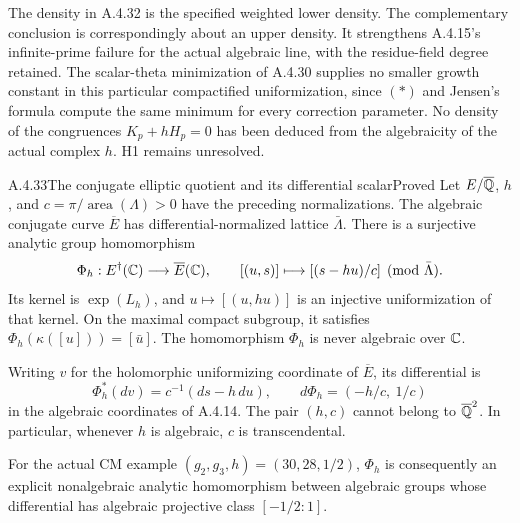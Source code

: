 The density in A.4.32 is the specified weighted lower density.
The complementary conclusion is correspondingly about an upper
density. It strengthens A.4.15's infinite-prime failure for the
actual algebraic line, with the residue-field degree retained.
The scalar-theta minimization of A.4.30 supplies no smaller growth
constant in this particular compactified uniformization, since
$(*)$ and Jensen's formula compute the same minimum for every
correction parameter. No density of the congruences
$K_p+hH_p=0$ has been deduced from the algebraicity of the actual
complex $h$. H1 remains unresolved.

\begin{result}{A.4.33}{The conjugate elliptic quotient and its differential scalar}{Proved}
Let $E/\overline{\mathbb Q}$, $h$, and $c=\pi/\operatorname{area}(\Lambda)>0$
have the preceding normalizations. The algebraic conjugate curve
$\overline E$ has differential-normalized lattice $\bar\Lambda$.
There is a surjective analytic group homomorphism
\[
 \Phi_h:E^\dagger(\mathbb C)\longrightarrow\overline E(\mathbb C),
 \qquad [(u,s)]\longmapsto[(s-hu)/c]\pmod{\bar\Lambda}.
\]
Its kernel is $\exp(L_h)$, and $u\mapsto[(u,hu)]$ is an
injective uniformization of that kernel. On the maximal compact
subgroup, it satisfies
$\Phi_h(\kappa([u]))=[\bar u]$.
The homomorphism $\Phi_h$ is never algebraic over $\mathbb C$.

Writing $v$ for the holomorphic uniformizing coordinate of
$\overline E$, its differential is
\[
 \Phi_h^*(dv)=c^{-1}(ds-h\,du),
 \qquad d\Phi_h=(-h/c,\ 1/c)
\]
in the algebraic coordinates of A.4.14. The pair $(h,c)$
cannot belong to $\overline{\mathbb Q}^2$. In particular, whenever $h$ is
algebraic, $c$ is transcendental.

For the actual CM example $(g_2,g_3,h)=(30,28,1/2)$,
$\Phi_h$ is consequently an explicit nonalgebraic analytic
homomorphism between algebraic groups whose differential has
algebraic projective class $[-1/2:1]$.
\end{result}

